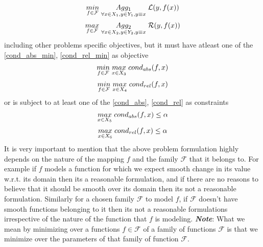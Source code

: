 \begin{equation} \label{opt_loss}
\underset{f\in \mathcal{F}}{min}\hspace{1mm} \underset{\forall x\in X_1, y \in Y_1, y \equiv x}{Agg_1} \hspace{1mm} \mathcal{L}(y,f(x))
\end{equation}
\begin{equation} \label{opt_reward}
\underset{f\in \mathcal{F}}{max}\hspace{1mm} \underset{\forall x\in X_2, y \in Y_2, y \equiv x}{Agg_2} \hspace{1mm} \mathcal{R}(y,f(x))
\end{equation}
including other problems specific objectives, but it must have atleast one of the \ref{cond_abs_min}, \ref{cond_rel_min} as objective
\begin{equation} \label{cond_abs_min}
\underset{f\in \mathcal{F}}{min}\hspace{1mm}\underset{x \in X_3}{max}\hspace{1mm} cond_{abs}(f,x)
\end{equation}
\begin{equation} \label{cond_rel_min}
\underset{f\in \mathcal{F}}{min}\hspace{1mm} \underset{x \in X_4}{max}\hspace{1mm}cond_{rel}(f,x)
\end{equation}
or is subject to at least one of the \ref{cond_abs}, \ref{cond_rel} as constraints
\begin{equation} \label{cond_abs}
\underset{x \in X_5}{max}\hspace{1mm}cond_{abs}(f,x) \le \alpha 
\end{equation}
\begin{equation} \label{cond_rel}
\underset{x \in X_6}{max}\hspace{1mm} cond_{rel}(f,x) \le \alpha 
\end{equation}
\newline It is very important to mention that the above problem formulation highly depends on the nature of the mapping $f$ and the family $\mathcal{F}$ that it belongs to. For example if $f$ models a function for which we expect smooth change in its value w.r.t. its domain then its a reasonable formulation, and if there are no reasons to believe that it should be smooth over its domain then its not a reasonable formulation. Similarly for a chosen family $\mathcal{F}$ to model $f$, if $\mathcal{F}$ doesn't have smooth functions belonging to it then its not a reasonable formulations irrespective of the nature of the function that $f$ is modeling.
\newline\newline
\textbf{\textit{Note}}: What we mean by minimizing over a functions $f \in \mathcal{F}$ of a family of functions $\mathcal{F}$ is that we minimize over the parameters of that family of function $\mathcal{F}$.

